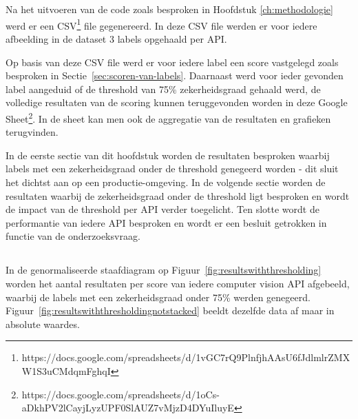 
\chapter{}
\label{ch:resultaten}

\section{}
\label{sec:resultaten-inleiding}
Na het uitvoeren van de code zoals besproken in Hoofdstuk \ref{ch:methodologie} werd er een CSV\footnote{https://docs.google.com/spreadsheets/d/1vGC7rQ9PlnfjhAAsU6fJdlmlrZMXW1S3uCMdqmFghqI} file gegenereerd. In deze CSV file werden er voor iedere afbeelding in de dataset 3 labels opgehaald per API.

Op basis van deze CSV file werd er voor iedere label een score vastgelegd zoals besproken in Sectie~\ref{sec:scoren-van-labels}. Daarnaast werd voor ieder gevonden label aangeduid of de threshold van 75\% zekerheidsgraad gehaald werd, de volledige resultaten van de scoring kunnen teruggevonden worden in deze Google Sheet\footnote{https://docs.google.com/spreadsheets/d/1oCs-aDkhPV2lCayjLyzUPF0SlAUZ7vMjzD4DYuIluyE}. In de sheet kan men ook de aggregatie van de resultaten en grafieken terugvinden.

In de eerste sectie van dit hoofdstuk worden de resultaten besproken waarbij labels met een zekerheidsgraad onder de threshold genegeerd worden - dit sluit het dichtst aan op een productie-omgeving. In de volgende sectie worden de resultaten waarbij de zekerheidsgraad onder de threshold ligt besproken en wordt de impact van de threshold per API verder toegelicht. Ten slotte wordt de performantie van iedere API besproken en wordt er een besluit getrokken in functie van de onderzoeksvraag.

\section{}
\label{sec:resultaten-met-thresholding}
In de genormaliseerde staafdiagram op Figuur~\ref{fig:resultswiththresholding} worden het aantal resultaten per score van iedere computer vision API afgebeeld, waarbij de labels met een zekerheidsgraad onder 75\% werden genegeerd. Figuur~\ref{fig:resultswiththresholdingnotstacked} beeldt dezelfde data af maar in absolute waardes.

